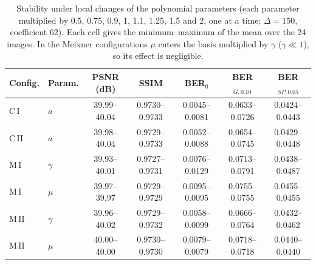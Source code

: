 \begin{table}[t]
\centering
\caption{Stability under local changes of the polynomial parameters (each parameter multiplied by 0.5, 0.75, 0.9, 1, 1.1, 1.25, 1.5 and 2, one at a time; $\Delta=150$, coefficient 62). Each cell gives the minimum--maximum of the mean over the 24 images. In the Meixner configurations $\mu$ enters the basis multiplied by $\gamma$ ($\gamma\ll 1$), so its effect is negligible.}
\label{tab:poly_param_sensitivity}
\setlength{\tabcolsep}{3pt}
\small
\begin{tabular}{llccccc}
\toprule
Config. & Param. & PSNR (dB) & SSIM & BER$_0$ & BER$_{G,0.10}$ & BER$_{SP,0.05}$ \\
\midrule
C\,I & $a$ & 39.99--40.04 & 0.9730--0.9733 & 0.0045--0.0081 & 0.0633--0.0726 & 0.0424--0.0443 \\
C\,II & $a$ & 39.98--40.04 & 0.9729--0.9733 & 0.0052--0.0088 & 0.0654--0.0745 & 0.0429--0.0448 \\
M\,I & $\gamma$ & 39.93--40.01 & 0.9727--0.9731 & 0.0076--0.0129 & 0.0713--0.0791 & 0.0438--0.0487 \\
M\,I & $\mu$ & 39.97--39.97 & 0.9729--0.9729 & 0.0095--0.0095 & 0.0755--0.0755 & 0.0455--0.0455 \\
M\,II & $\gamma$ & 39.96--40.02 & 0.9729--0.9732 & 0.0058--0.0099 & 0.0666--0.0764 & 0.0432--0.0462 \\
M\,II & $\mu$ & 40.00--40.00 & 0.9730--0.9730 & 0.0079--0.0079 & 0.0718--0.0718 & 0.0440--0.0440 \\
\bottomrule
\end{tabular}
\end{table}
